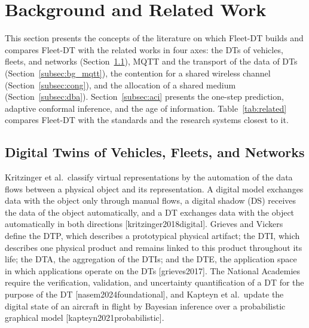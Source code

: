 \section{Background and Related Work}\label{sec:background}

This section presents the concepts of the literature on which Fleet-DT builds and compares Fleet-DT with the related works in four axes: the DTs of vehicles, fleets, and networks (Section~\ref{subsec:bg_dt}), MQTT and the transport of the data of DTs (Section~\ref{subsec:bg_mqtt}), the contention for a shared wireless channel (Section~\ref{subsec:cong}), and the allocation of a shared medium (Section~\ref{subsec:dba}). Section~\ref{subsec:aci} presents the one-step prediction, adaptive conformal inference, and the age of information. Table~\ref{tab:related} compares Fleet-DT with the standards and the research systems closest to it.



\subsection{Digital Twins of Vehicles, Fleets, and Networks}\label{subsec:bg_dt}
Kritzinger et al.\ classify virtual representations by the automation of the data flows between a physical object and its representation. A digital model exchanges data with the object only through manual flows, a digital shadow (DS) receives the data of the object automatically, and a DT exchanges data with the object automatically in both directions [kritzinger2018digital]. Grieves and Vickers define the DTP, which describes a prototypical physical artifact; the DTI, which describes one physical product and remains linked to this product throughout its life; the DTA, the aggregation of the DTIs; and the DTE, the application space in which applications operate on the DTs [grieves2017]. The National Academies require the verification, validation, and uncertainty quantification of a DT for the purpose of the DT [nasem2024foundational], and Kapteyn et al.\ update the digital state of an aircraft in flight by Bayesian inference over a probabilistic graphical model [kapteyn2021probabilistic].

